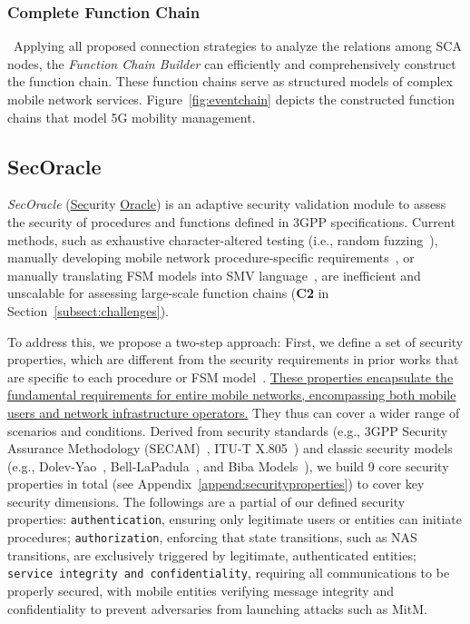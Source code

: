 \subsubsection{Complete Function Chain}~Applying all proposed connection strategies to analyze the relations among SCA nodes, the \textit{Function Chain Builder} can efficiently and comprehensively construct the function chain. 
These function chains serve as structured models of complex mobile network services. Figure~\ref{fig:eventchain} depicts the constructed function chains that model 5G mobility management.   

\subsection{SecOracle}
\label{subsect:secoracle}

\textit{SecOracle} (\ul{Sec}urity \ul{Oracle}) is an adaptive security validation module to assess the security of procedures and functions defined in 3GPP specifications. Current methods, such as exhaustive character-altered testing (i.e., random fuzzing~\cite{godefroid2020fuzzing}), manually developing mobile network procedure-specific requirements~\cite{chen2023sherlock,al2024hermes}, or manually translating FSM models into SMV language~\cite{clarke1996symbolic,al2024hermes,hussain20195greasoner,hussain2018lteinspector}, are inefficient and unscalable for assessing large-scale function chains (\textbf{C2} in Section~\ref{subsect:challenges}). 

To address this, we propose a two-step approach: 
First, we define a set of security properties, which are different from the security requirements in prior works that are specific to each procedure or FSM model~\cite{chen2023sherlock,al2024hermes}. \ul{These properties encapsulate the fundamental requirements for entire mobile networks, encompassing both mobile users and network infrastructure operators.} They thus can cover a wider range of scenarios and conditions. 
Derived from security standards (e.g., 3GPP Security Assurance Methodology (SECAM)~\cite{3gppTR33916v16}, ITU-T X.805~\cite{ituTX805}) and classic security models (e.g., Dolev-Yao~\cite{dolev2003security}, Bell-LaPadula~\cite{lapadula1996secure}, and Biba Models~\cite{Biba}), we build 9 core security properties in total (see Appendix~\ref{append:securityproperties}) to cover key security dimensions. The followings are a partial of our defined security properties: \texttt{authentication}, ensuring only legitimate users or entities can initiate procedures; \texttt{authorization}, enforcing that state transitions, such as NAS transitions, are exclusively triggered by legitimate, authenticated entities; \texttt{service integrity and confidentiality}, requiring all communications to be properly secured, with mobile entities verifying message integrity and confidentiality to prevent adversaries from launching attacks such as MitM. 

